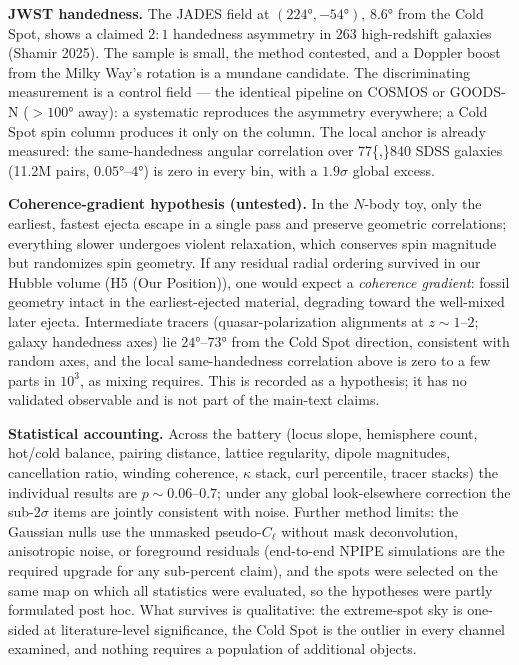 \documentclass[
]{article}
\begin{document}
\textbf{JWST handedness.} The JADES field at \((224°, -54°)\), \(8.6°\)
from the Cold Spot, shows a claimed \(2\!:\!1\) handedness asymmetry in
263 high-redshift galaxies (Shamir 2025). The sample is small, the
method contested, and a Doppler boost from the Milky Way's rotation is a
mundane candidate. The discriminating measurement is a control field ---
the identical pipeline on COSMOS or GOODS-N (\(> 100°\) away): a
systematic reproduces the asymmetry everywhere; a Cold Spot spin column
produces it only on the column. The local anchor is already measured:
the same-handedness angular correlation over 77\{,\}840 SDSS galaxies
(11.2M pairs, \(0.05°\)--\(4°\)) is zero in every bin, with a
\(1.9\sigma\) global excess.

\textbf{Coherence-gradient hypothesis (untested).} In the \(N\)-body
toy, only the earliest, fastest ejecta escape in a single pass and
preserve geometric correlations; everything slower undergoes violent
relaxation, which conserves spin magnitude but randomizes spin geometry.
If any residual radial ordering survived in our Hubble volume (H5 (Our
Position)), one would expect a \emph{coherence gradient}: fossil
geometry intact in the earliest-ejected material, degrading toward the
well-mixed later ejecta. Intermediate tracers (quasar-polarization
alignments at \(z \sim 1\)--\(2\); galaxy handedness axes) lie
\(24°\)--\(73°\) from the Cold Spot direction, consistent with random
axes, and the local same-handedness correlation above is zero to a few
parts in \(10^3\), as mixing requires. This is recorded as a hypothesis;
it has no validated observable and is not part of the main-text claims.

\textbf{Statistical accounting.} Across the battery (locus slope,
hemisphere count, hot/cold balance, pairing distance, lattice
regularity, dipole magnitudes, cancellation ratio, winding coherence,
\(\kappa\) stack, curl percentile, tracer stacks) the individual results
are \(p \sim 0.06\)--\(0.7\); under any global look-elsewhere correction
the sub-\(2\sigma\) items are jointly consistent with noise. Further
method limits: the Gaussian nulls use the unmasked pseudo-\(C_\ell\)
without mask deconvolution, anisotropic noise, or foreground residuals
(end-to-end NPIPE simulations are the required upgrade for any
sub-percent claim), and the spots were selected on the same map on which
all statistics were evaluated, so the hypotheses were partly formulated
post hoc. What survives is qualitative: the extreme-spot sky is
one-sided at literature-level significance, the Cold Spot is the outlier
in every channel examined, and nothing requires a population of
additional objects.
\end{document}
